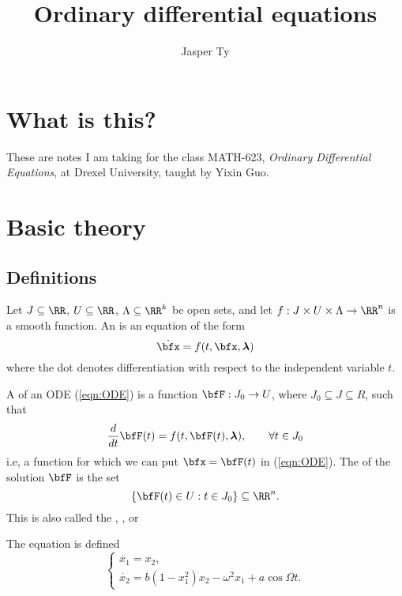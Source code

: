 \documentclass{article}
\title{Ordinary differential equations}
\author{Jasper Ty}
\date{}
\newcommand*\bflam{\bm{\lambda}}
\begin{document}
\maketitle

\section*{What is this?}

These are notes I am taking for the class MATH-623, \textit{Ordinary Differential Equations}, at Drexel University, taught by Yixin Guo.

\tableofcontents

\newpage

\section{Basic theory}

\subsection{Definitions}

\begin{definition}
    Let $J \subseteq \RR$, $U \subseteq \RR$, $\Lambda \subseteq \RR^k$ be open sets, and let $f: J \times U \times \Lambda \to \RR^n$ is a smooth function.
    An  is an equation of the form 
    \begin{equation}
        \label{eqn:ODE}
        \dot{\bfx}
        =
        f(t, \bfx, \bm{\lambda})
    \end{equation}
    where the dot denotes differentiation with respect to the independent variable $t$.
\end{definition}

\begin{definition}
    A  of an ODE (\ref{eqn:ODE}) is a function $\bfF: J_0 \to U$, where $J_0 \subseteq J \subseteq R$, such that 
    \[
        \frac{d}{dt}\bfF(t)
        =
        f(t, \bfF(t), \bflam),\qquad 
        \forall t \in J_0
    \]
    i.e, a function for which we can put $\bfx = \bfF(t)$ in (\ref{eqn:ODE}).
    The  of the solution $\bfF$ is the set
    \[
        \{
            \bfF(t) \in U: t \in J_0
        \}
        \subseteq \RR^n.
    \]
    This is also called the , , or 
\end{definition}

\begin{example}
    The  equation is defined
    \begin{equation}
        \label{eqn:ForcedVanDerPol}
        \begin{cases}
            \dot{x_1} = x_2, \\
            \dot{x_2} = b(1-x_1^2)x_2- \omega^2x_1 + a \cos \Omega t.
        \end{cases}
    \end{equation}
\end{example}
\end{document}
